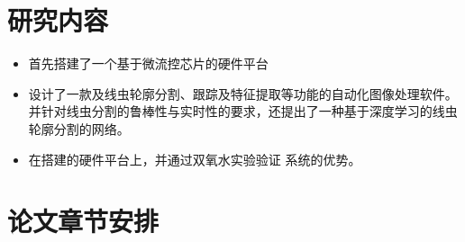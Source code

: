 \section{研究内容}
\label{sec:intro:org}
	\begin{itemize}
	  \item 首先搭建了一个基于微流控芯片的硬件平台
	  \item 设计了一款及线虫轮廓分割、跟踪及特征提取等功能的自动化图像处理软件。
	  并针对线虫分割的鲁棒性与实时性的要求，还提出了一种基于深度学习的线虫轮廓分割的网络。
	  \item 在搭建的硬件平台上，并通过双氧水实验验证 系统的优势。
	\end{itemize}
\section{论文章节安排}
\label{sec:intro:org}
